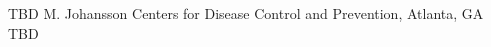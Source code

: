 
    \begin{abstract_online}{TBD}{%
        M. Johansson}{%
        }{%
        Centers for Disease Control and Prevention, Atlanta, GA}
    TBD  
    
    \end{abstract_online}
    